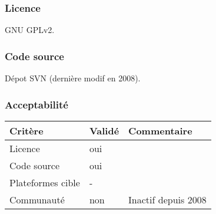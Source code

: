 \subsubsection{Licence}
GNU GPLv2.

\subsubsection{Code source}
Dépot SVN (dernière modif en 2008).

\subsubsection{Acceptabilité}
\begin{tabular}{lll}
\toprule
	Critère				&	Validé		&	Commentaire	\\
\midrule
	Licence				&	oui			&		\\
	Code source			&	oui			&		\\
	Plateformes cible	&	-			&		\\
	Communauté			&	non			&	Inactif depuis 2008	\\
\bottomrule
\end{tabular}

